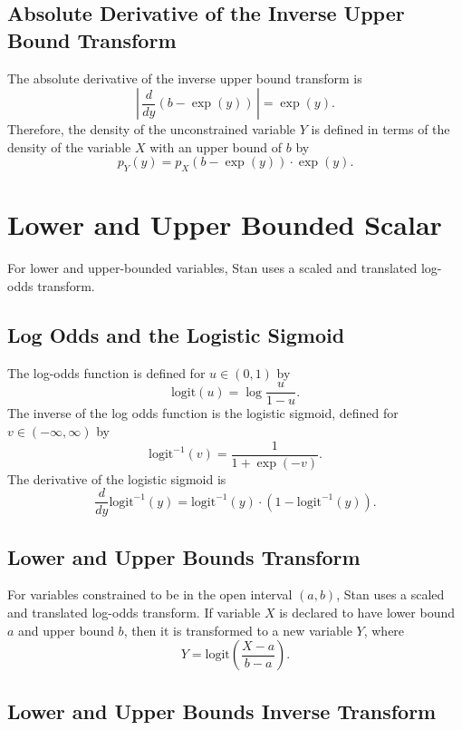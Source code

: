 \documentclass[10pt]{report}
\newcommand{\Stan}{Stan\xspace}
\begin{document}
\subsection{Absolute Derivative of the Inverse Upper Bound Transform}

The absolute derivative of the inverse upper bound transform is 
\[
\left| \,
\frac{d}{dy} \left( b - \exp(y) \right)
\, \right|
= \exp(y).
\]
%
Therefore, the density of the unconstrained variable $Y$ is defined in
terms of the density of the variable $X$ with an upper bound of $b$ by
%
\[
p_Y(y) 
 =   p_X \!\left( b - \exp(y) \right) \cdot \exp(y).
\]


\section{Lower and Upper Bounded Scalar}

For lower and upper-bounded variables, \Stan uses a scaled and
translated log-odds transform.

\subsection{Log Odds and the Logistic Sigmoid}

The log-odds function is defined for $u \in (0,1)$ by
%
\[
\mbox{logit}(u) = \log \frac{u}{1 - u}.
\]
% 
The inverse of the log odds function is the logistic sigmoid, defined 
for $v \in (-\infty,\infty)$ by
%
\[
\mbox{logit}^{-1}(v) = \frac{1}{1 + \exp(-v)}.
\]
% 
The derivative of the logistic sigmoid is
%
\[
\frac{d}{dy} \mbox{logit}^{-1}(y) 
= \mbox{logit}^{-1}(y) \cdot \left( 1 - \mbox{logit}^{-1}(y) \right).
\]

\subsection{Lower and Upper Bounds Transform}

For variables constrained to be in the open interval $(a,b)$, \Stan
uses a scaled and translated log-odds transform.  If variable $X$ is
declared to have lower bound $a$ and upper bound $b$, then it is
transformed to a new variable $Y$, where
%
\[
Y = \mbox{logit} \left( \frac{X - a}{b - a} \right).
\]
%

\subsection{Lower and Upper Bounds Inverse Transform}
\end{document}

